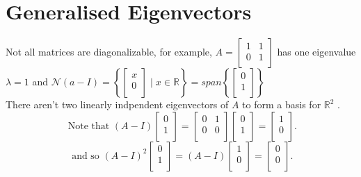 \documentclass{report}
\begin{document}
 \section{Generalised Eigenvectors}
 Not all matrices are diagonalizable, for example, $ A = \begin{bmatrix}
 1 & 1\\
 0 & 1\\
\end{bmatrix}$ has one eigenvalue  $ \lambda =1$ and $ \mathcal{N} \left(  a - I \right) = \left\{ \begin{bmatrix}
x\\
0\\
\end{bmatrix}
\mid x \in \mathbb{R}  \right\} = span \left\{  \begin{bmatrix}
0\\
1\\
\end{bmatrix}
 \right\} $
 \\
 There aren't two linearly indpendent eigenvectors of $ A$ to form a basis for $ \mathbb{R} ^2 $ .\\
 \[
 \text{ Note that }      \left( A - I \right)  \begin{bmatrix}
 0\\
 1\\
 \end{bmatrix}
 = \begin{bmatrix}
 0 & 1\\
 0 & 0\\
 \end{bmatrix} \begin{bmatrix}
 0\\
 1\\
 \end{bmatrix}
 = \begin{bmatrix}
 1\\
 0\\
 \end{bmatrix}
 .\] 
  \[
  \text{ and so } \left( A - I \right) ^2     \begin{bmatrix}
  0\\
  1\\
  \end{bmatrix}
  = \left(  A -I \right)  \begin{bmatrix}
  1\\
  0\\
  \end{bmatrix}
   = \begin{bmatrix}
   0\\
   0\\
   \end{bmatrix}
  .\] 
\end{document}
